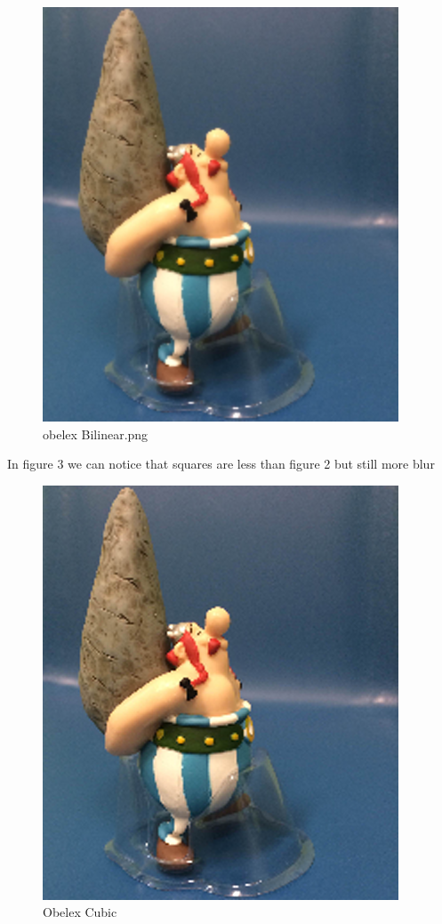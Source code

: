 \documentclass{article}
\begin{document}
\begin{figure}[H]
	\begin{center}
		\includegraphics[scale=1]{obelexBilinear.png}
	\end{center}
	\caption{obelex Bilinear.png}
\end{figure}
In figure 3 we can notice that squares are less than figure 2 but still more blur 
\begin{figure}[H]
\begin{center}
		\includegraphics[scale=1]{ObelexCubic.png}
\end{center}
	\caption{Obelex Cubic}
\end{figure}
\end{document}
